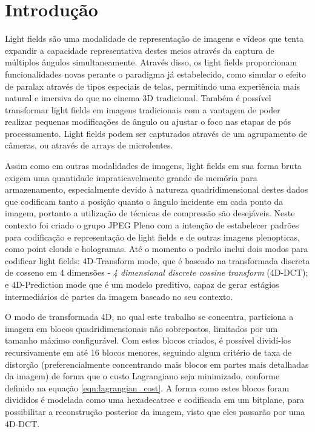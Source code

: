 \chapter{Introdução}
Light fields são uma modalidade de representação de imagens e vídeos que tenta expandir a capacidade representativa destes meios através da captura de
múltiplos ângulos simultaneamente. Através disso, os light fields proporcionam funcionalidades novas perante o paradigma já estabelecido, como simular
o efeito de paralax através de tipos especiais de telas, permitindo uma experiência mais natural e imersiva do que no cinema 3D tradicional. Também é
possível transformar light fields em imagens tradicionais com a vantagem de poder realizar pequenas modificações de ângulo ou ajustar o foco nas 
etapas de pós processamento. Light fields podem ser capturados através de um agrupamento de câmeras, ou através de arrays de microlentes.

Assim como em outras modalidades de imagens, light fields em sua forma bruta exigem uma quantidade impraticavelmente grande de memória para 
armazenamento, especialmente devido à natureza quadridimensional destes dados que codificam tanto a posição quanto o ângulo incidente em cada ponto
da imagem, portanto a utilização de técnicas de compressão são desejáveis. Neste contexto foi criado o grupo JPEG Pleno com a intenção de estabelecer
padrões para codificação e representação de light fields e de outras imagens plenopticas, como point clouds e hologramas. Até o momento o padrão 
inclui dois modos para codificar light fields: 4D-Transform mode, que é baseado na transformada discreta de cosseno em 4 dimensões - 
\textit{4 dimensional discrete cossine transform} (4D-DCT); e 4D-Prediction mode que é um modelo preditivo, capaz de gerar estágios intermediários de
partes da imagem baseado no seu contexto.

O modo de transformada 4D, no qual este trabalho se concentra, particiona a imagem em blocos quadridimensionais não sobrepostos,
limitados por um tamanho máximo configurável. Com estes blocos criados, é possível dividí-los recursivamente em até 16 blocos menores, seguindo algum
critério de taxa de distorção (preferencialmente concentrando mais blocos em partes mais detalhadas da imagem) de forma que o custo Lagrangiano seja
minimizado, conforme definido na equação \ref{eqn:lagrangian_cost}. A forma como estes blocos foram divididos é modelada como uma hexadecatree e
codificada em um bitplane, para possibilitar a reconstrução posterior da imagem, visto que eles passarão por uma 4D-DCT.

